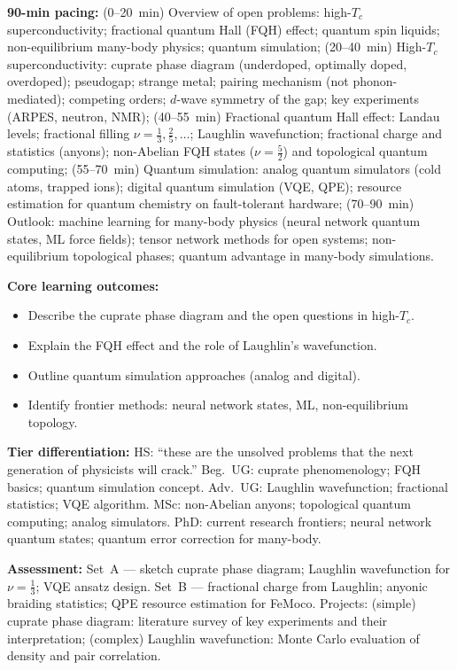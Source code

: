 \documentclass[11pt,a4paper]{article}
\begin{document}
\medskip

\begin{tcolorbox}[modulebox, title={Module~II.7 / L12: Open Problems and Frontiers}]
\textbf{90-min pacing:} (0--20~min) Overview of open problems: high-$T_c$ superconductivity; fractional quantum Hall (FQH) effect; quantum spin liquids; non-equilibrium many-body physics; quantum simulation; (20--40~min) High-$T_c$ superconductivity: cuprate phase diagram (underdoped, optimally doped, overdoped); pseudogap; strange metal; pairing mechanism (not phonon-mediated); competing orders; $d$-wave symmetry of the gap; key experiments (ARPES, neutron, NMR); (40--55~min) Fractional quantum Hall effect: Landau levels; fractional filling $\nu=\tfrac{1}{3},\tfrac{2}{5},\ldots$; Laughlin wavefunction; fractional charge and statistics (anyons); non-Abelian FQH states ($\nu=\tfrac{5}{2}$) and topological quantum computing; (55--70~min) Quantum simulation: analog quantum simulators (cold atoms, trapped ions); digital quantum simulation (VQE, QPE); resource estimation for quantum chemistry on fault-tolerant hardware; (70--90~min) Outlook: machine learning for many-body physics (neural network quantum states, ML force fields); tensor network methods for open systems; non-equilibrium topological phases; quantum advantage in many-body simulations.

\medskip\textbf{Core learning outcomes:}
\begin{itemize}[leftmargin=1.4em,topsep=2pt,itemsep=1pt]
  \item Describe the cuprate phase diagram and the open questions in high-$T_c$.
  \item Explain the FQH effect and the role of Laughlin's wavefunction.
  \item Outline quantum simulation approaches (analog and digital).
  \item Identify frontier methods: neural network states, ML, non-equilibrium topology.
\end{itemize}

\medskip\textbf{Tier differentiation:}
HS: ``these are the unsolved problems that the next generation of physicists will crack.''
Beg.\ UG: cuprate phenomenology; FQH basics; quantum simulation concept.
Adv.\ UG: Laughlin wavefunction; fractional statistics; VQE algorithm.
MSc: non-Abelian anyons; topological quantum computing; analog simulators.
PhD: current research frontiers; neural network quantum states; quantum error correction for many-body.

\medskip\textbf{Assessment:}
Set~A --- sketch cuprate phase diagram; Laughlin wavefunction for $\nu=\tfrac{1}{3}$; VQE ansatz design.
Set~B --- fractional charge from Laughlin; anyonic braiding statistics; QPE resource estimation for FeMoco.
Projects: (simple) cuprate phase diagram: literature survey of key experiments and their interpretation;
(complex) Laughlin wavefunction: Monte Carlo evaluation of density and pair correlation.
\end{tcolorbox}
\end{document}
